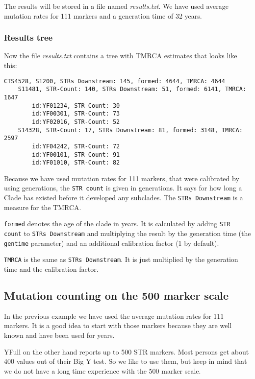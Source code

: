 The results will be stored in a file named \emph{results.txt}.
We have used average mutation rates for 111 markers and a
generation time of 32 years.


\subsubsection*{Results tree}

Now the file \emph{results.txt} contains a tree with TMRCA
estimates that looks like this:

\begin{verbatim}
CTS4528, S1200, STRs Downstream: 145, formed: 4644, TMRCA: 4644
    S11481, STR-Count: 140, STRs Downstream: 51, formed: 6141, TMRCA: 1647
        id:YF01234, STR-Count: 30
        id:YF00301, STR-Count: 73
        id:YF02016, STR-Count: 52
    S14328, STR-Count: 17, STRs Downstream: 81, formed: 3148, TMRCA: 2597
        id:YF04242, STR-Count: 72
        id:YF00101, STR-Count: 91
        id:YF01010, STR-Count: 82
\end{verbatim}

Because we have used mutation rates for 111 markers, that
were calibrated by using generations, the \texttt{STR count}
is given in generations. It says for how long a Clade has
existed before it developed any subclades. The
\texttt{STRs Downstream} is a measure for the TMRCA.

\texttt{formed} denotes the age of the clade in years. It is
calculated by adding \texttt{STR count} to \texttt{STRs Downstream}
and multiplying the result by the generation time (the
\texttt{gentime} parameter) and an additional calibration
factor (1 by default).

\texttt{TMRCA} is the same as \texttt{STRs Downstream}. It is
just multiplied by the generation time and the calibration
factor.


\subsection{Mutation counting on the 500 marker scale}

In the previous example we have used the average mutation rates
for 111 markers. It is a good idea to start with those markers
because they are well known and have been used for years.

YFull on the other hand reports up to 500 STR markers. Most persons
get about 400 values out of their Big Y test. So we like to use
them, but keep in mind that we do not have a long time experience
with the 500 marker scale.

